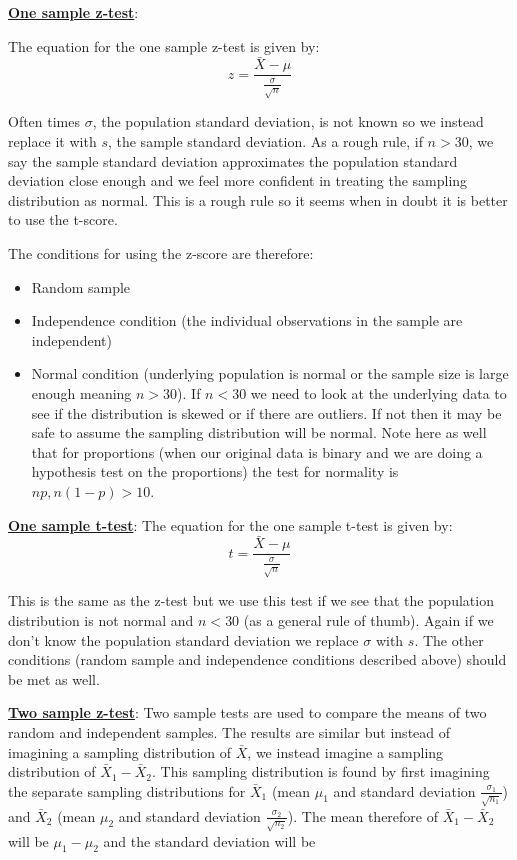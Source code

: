 \noindent \underline{\textbf{One sample z-test}}:

The equation for the one sample z-test is given by:
\begin{equation}
z = \frac{\bar{X} - \mu}{\frac{\sigma}{\sqrt{n}}}
\end{equation}

Often times $\sigma$, the population standard deviation, is not known so we instead replace it with $s$, the sample standard deviation. As a rough rule, if $n>30$, we say the sample standard deviation approximates the population standard deviation close enough and we feel more confident in treating the sampling distribution as normal. This is a rough rule so it seems when in doubt it is better to use the t-score. 

The conditions for using the z-score are therefore:
\begin{itemize}
\item Random sample
\item Independence condition (the individual observations in the sample are independent)
\item Normal condition (underlying population is normal or the sample size is large enough meaning $n>30$). If $n<30$ we need to look at the underlying data to see if the distribution is skewed or if there are outliers. If not then it may be safe to assume the sampling distribution will be normal. Note here as well that for proportions (when our original data is binary and we are doing a hypothesis test on the proportions) the test for normality is $np, n(1-p) > 10$.
\end{itemize}

\noindent \underline{\textbf{One sample t-test}}:
The equation for the one sample t-test is given by:
\begin{equation}
t= \frac{\bar{X} - \mu}{\frac{\sigma}{\sqrt{n}}}
\end{equation}

This is the same as the z-test but we use this test if we see that the population distribution is not normal and $n<30$ (as a general rule of thumb). Again if we don't know the population standard deviation we replace $\sigma$ with $s$. The other conditions (random sample and independence conditions described above) should be met as well.
\newline

\noindent \underline{\textbf{Two sample z-test}}:
Two sample tests are used to compare the means of two random and independent samples. The results are similar but instead of imagining a sampling distribution of $\bar{X}$, we instead imagine a sampling distribution of $\bar{X}_1 - \bar{X}_2$. This sampling distribution is found by first imagining the separate sampling distributions for $\bar{X}_1$ (mean $\mu_1$ and standard deviation $\frac{\sigma_1}{\sqrt{n_1}}$) and $\bar{X}_2$ (mean $\mu_2$ and standard deviation $\frac{\sigma_2}{\sqrt{n_2}}$). The mean therefore of $\bar{X}_1 - \bar{X}_2$ will be $\mu_1 - \mu_2$ and the standard deviation will be

